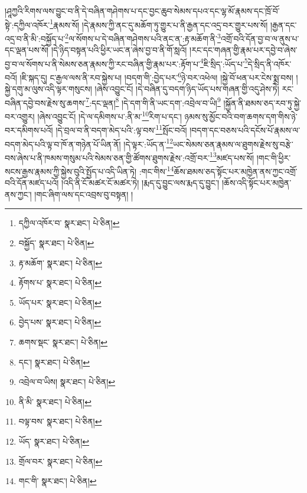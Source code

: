 །ཤཱཀྱའི་རིགས་ལས་བྱུང་བ་ནི་དེ་བཞིན་གཤེགས་པ་དང་བྱང་ཆུབ་སེམས་དཔའ་དང་ལྷ་མོ་རྣམས་དང་ཁྲོ་བོ་སྟེ་:དཀྱིལ་འཁོར་\footnote{དཀྱིལ་འཁོར་བ་  སྣར་ཐང་།  པེ་ཅིན། }རྣམས་སོ། །དེ་རྣམས་ཀྱི་ནང་དུ་མཆོག་ཏུ་གྱུར་པ་ནི་རྒྱན་དང་འདྲ་བར་གྱུར་པས་སོ། །རྒྱན་དང་འདྲ་བ་ནི་མི་:བསྐྱོད་པ་\footnote{བསྐྱོད་  སྣར་ཐང་།  པེ་ཅིན། }ལ་སོགས་པ་དེ་བཞིན་གཤེགས་པའི་ནང་ན་:རྟ་མཆོག་ནི་\footnote{རྟ་མཆོག་  སྣར་ཐང་།  པེ་ཅིན། }འགྲོ་བའི་དོན་བྱ་བ་ལ་ནུས་པ་དང་ལྡན་པས་སོ། །དེ་ཉིད་བསྟན་པའི་ཕྱིར་ཡང་ན་ཞེས་བྱ་བ་ནི་གོ་སླའོ། །རང་དང་གཞན་གྱི་རྣམ་པར་དབྱེ་བ་ཞེས་བྱ་བ་ལ་སོགས་པ་ནི་སེམས་ཅན་རྣམས་ཀྱི་རང་བཞིན་གྱི་རྣམ་པར་:རྟོག་པ་\footnote{རྟོགས་པ་  སྣར་ཐང་།  པེ་ཅིན། }ཇི་སྲིད་:ཡོད་པ་\footnote{ཡོད་པར་  སྣར་ཐང་།  པེ་ཅིན། }དེ་སྲིད་ནི་འཁོར་བའོ། །ཇི་སྐད་དུ། ང་རྒྱལ་ལས་ནི་རབ་སྐྱེས་པ། །བདག་གི་:བྱེད་པར་\footnote{བྱེད་པས་  སྣར་ཐང་།  པེ་ཅིན། }ཉེ་བར་འཕེལ། །སྐྱེ་བོ་ཕན་པར་ངེས་སྨྲ་བས། །སྐྱེ་དགུ་མ་ལུས་འདི་ལྟར་གསུངས། །ཞེས་འབྱུང་ངོ། །དེ་བཞིན་དུ་བདག་ཉིད་ཡོད་པས་གཞན་གྱི་འདུ་ཤེས་ཏེ། རང་བཞིན་དབྱེ་བས་རྗེས་སུ་ཆགས་\footnote{ཆགས་སྡང་  སྣར་ཐང་།  པེ་ཅིན། }:དང་ལྡན།\footnote{དང་།  སྣར་ཐང་།  པེ་ཅིན། } །དེ་དག་གི་ནི་ཡང་དག་:འབྲེལ་བ་ཡི།\footnote{འབྲེལ་བ་ཡིས།  སྣར་ཐང་།  པེ་ཅིན། } །སྐྱོན་ནི་ཐམས་ཅད་རབ་ཏུ་སྐྱེ་བར་འགྱུར། །ཞེས་འབྱུང་ངོ། །དེ་ལ་དམིགས་པ་:ནི་མ་\footnote{ནི་མི་  སྣར་ཐང་།  པེ་ཅིན། }རིག་པ་དང་། ཉམས་སུ་མྱོང་བའི་བག་ཆགས་དག་གིས་ཉེ་བར་དམིགས་པའོ། །དེ་བྲལ་བ་ནི་བདག་མེད་པའི་:ལྟ་བས་\footnote{བལྟ་བས་  སྣར་ཐང་།  པེ་ཅིན། }སྤོང་བའོ། །བདག་དང་བཅས་པའི་དངོས་པོ་རྣམས་ལ་བདག་མེད་པའི་ལྟ་བ་ཁོ་ན་གཉེན་པོ་ཡིན་ནོ། །དེ་ལྟར་:ཡོད་ན་\footnote{ཡོད་  སྣར་ཐང་།  པེ་ཅིན། }ཡང་སེམས་ཅན་རྣམས་ལ་ཐུགས་རྗེས་སུ་བརྩེ་བས་ཞེས་པ་ནི་ཁམས་གསུམ་པའི་སེམས་ཅན་གྱི་ཚོགས་ཐུགས་རྗེས་:འགྲོ་བར་\footnote{གྲོལ་བར་  སྣར་ཐང་།  པེ་ཅིན། }མཛད་པས་སོ། །གང་གི་ཕྱིར་སངས་རྒྱས་རྣམས་ཀྱི་སྐྱེས་བུའི་སྤྱོད་པ་འདི་ཡིན་ཏེ། :གང་གིས་\footnote{གང་གི་  སྣར་ཐང་།  པེ་ཅིན། }ཆོས་ཐམས་ཅད་སྟོང་པར་མཁྱེན་ནས་ཀྱང་འགྲོ་བའི་དོན་མཛད་པའོ། །འདི་ནི་ངོ་མཚར་ངོ་མཚར་ཏེ། །རྨད་དུ་བྱུང་ལས་རྨད་དུ་བྱུང་། །ཆོས་འདི་སྟོང་པར་མཁྱེན་ནས་ཀྱང་། །གང་ཞིག་ལས་དང་འབྲས་བུ་བསྟན། །
